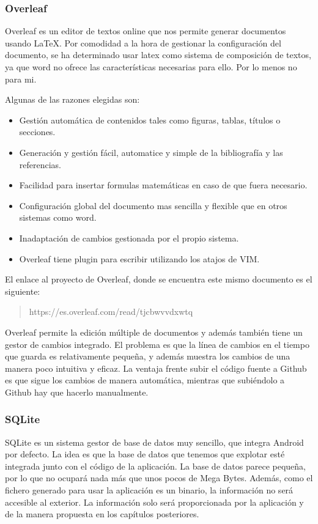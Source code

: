 \subsubsection{Overleaf}
Overleaf \cite{overleaf} es un editor de textos online que nos permite generar documentos usando \LaTeX. Por comodidad a la hora de gestionar la configuración del documento, se ha determinado usar latex como sistema de composición de textos, ya que word no ofrece las características necesarias para ello. Por lo menos no para mi. 

Algunas de las razones elegidas son:
\begin{itemize}
    \item Gestión automática de contenidos tales como figuras, tablas, títulos o secciones. 
    \item Generación y gestión fácil, automatice y simple de la bibliografía y las referencias.
    \item Facilidad para insertar formulas matemáticas en caso de que fuera necesario. 
    \item Configuración global del documento mas sencilla y flexible que en otros sistemas como word.
    \item Inadaptación de cambios gestionada por el propio sistema. 
    \item Overleaf tiene plugin para escribir utilizando los atajos de VIM. 
\end{itemize}

El enlace al proyecto de Overleaf, donde se encuentra este mismo documento es el siguiente:

\begin{quote}
https://es.overleaf.com/read/tjcbwvvdxwtq
\end{quote}

Overleaf permite la edición múltiple de documentos y además también tiene un gestor de cambios integrado. El problema es que la línea de cambios en el tiempo que guarda es relativamente pequeña, y además muestra los cambios de una manera poco intuitiva y eficaz. La ventaja frente subir el código fuente a Github es que sigue los cambios de manera automática, mientras que subiéndolo a Github hay que hacerlo manualmente. 

\subsubsection{SQLite}
SQLite \cite{sqlite} es un sistema gestor de base de datos muy sencillo, que integra Android por defecto. La idea es que la base de datos que tenemos que explotar esté integrada junto con el código de la aplicación. La base de datos parece pequeña, por lo que no ocupará nada más que unos pocos de Mega Bytes. Además, como el fichero generado para usar la aplicación es un binario, la información no será accesible al exterior. La información solo será proporcionada por la aplicación y de la manera propuesta en los capítulos posteriores. 


